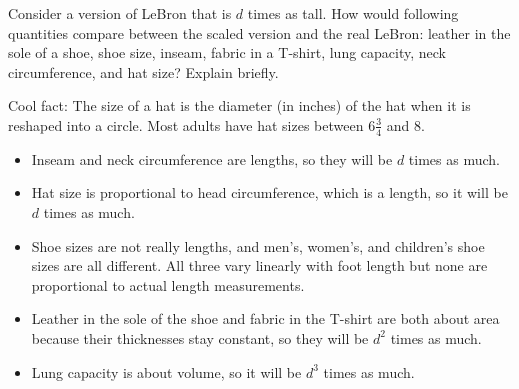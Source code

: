 \documentclass[nooutcomes]{ximera}
\begin{document}
\begin{problem}
Consider a version of LeBron that is $d$ times as tall.  How would following quantities compare between the scaled version and the real LeBron:   leather in the sole of a shoe, shoe size, inseam, fabric in a T-shirt, lung capacity, neck circumference, and hat size?  Explain briefly.  

Cool fact:  The size of a hat is the diameter (in inches) of the hat when it is reshaped into a circle.  Most adults have hat sizes between $6\frac{3}{4}$ and $8$.
\begin{freeResponse}
\begin{hint}
\begin{itemize}
\item Inseam and neck circumference are lengths, so they will be $d$ times as much.  
\item Hat size is proportional to head circumference, which is a length, so it will be $d$ times as much.  
\item Shoe sizes are not really lengths, and men's, women's, and children's shoe sizes are all different.  All three vary linearly with foot length but none are proportional to actual length measurements.   
\item Leather in the sole of the shoe and fabric in the T-shirt are both about area because their thicknesses stay constant, so they will be $d^2$ times as much. 
\item Lung capacity is about volume, so it will be $d^3$ times as much.  
\end{itemize}
\end{hint}
\end{freeResponse}
\end{problem}
\end{document}
